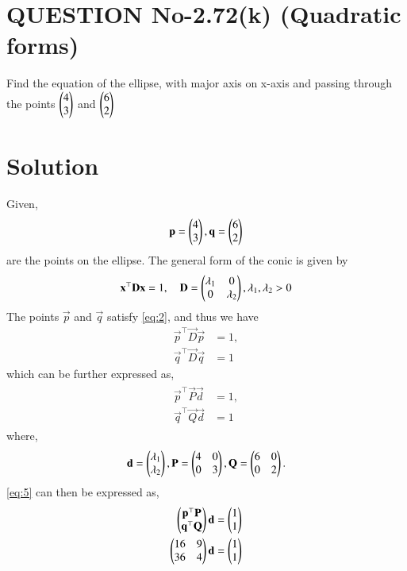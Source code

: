 \documentclass[journal,12pt,twocolumn]{IEEEtran}
\begin{document}
%
\section{QUESTION No-2.72(k) (Quadratic forms)}
\item Find the equation of the ellipse, with major axis on x-axis and passing through the points $\begin{pmatrix}4\\3\end{pmatrix}$  and $\begin{pmatrix} 6\\2\end{pmatrix}$ 
%
\section{Solution}
Given, 
\begin{align}
\mathbf{p} = \begin{pmatrix}4\\3\end{pmatrix} , \mathbf{q} = \begin{pmatrix} 6\\2\end{pmatrix}
\end{align}
are the points on the ellipse.
The general form of the conic is given by
\begin{align}
\label{eq:2}
\mathbf{x}^{\top}\mathbf{D}\mathbf{x} = 1, \quad \mathbf{D} = \begin{pmatrix}\lambda_1 & 0 \\ 0 & \lambda_2\end{pmatrix}, \lambda_1,\lambda_2 > 0
\end{align}
The points $\vec{p}$ and $\vec{q}$ satisfy \eqref{eq:2}, and thus we have
\begin{align}
\label{eq:ellipse_std_ab}
\vec{p}^{\top}\vec{D}\vec{p} &= 1,
\\
\vec{q}^{\top}\vec{D}\vec{q} &= 1
\end{align}
which can be further expressed as,
\begin{align}
\label{eq:5}
\begin{split}
\vec{p}^{\top}\vec{P}\vec{d} &= 1,
\\
\vec{q}^{\top}\vec{Q}\vec{d} &= 1
\end{split}
\end{align}
where,
\begin{align}
\mathbf{d} = \begin{pmatrix}\lambda_1\\ \lambda_2\end{pmatrix},
\mathbf{P} = \begin{pmatrix}4 & 0 \\ 0 & 3\end{pmatrix},
\mathbf{Q} = \begin{pmatrix}6 & 0 \\ 0 & 2\end{pmatrix}.
\end{align}
\eqref{eq:5} can then be expressed as,
\begin{align}
\begin{pmatrix}\mathbf{p}^{\top}\mathbf{P}\\ \mathbf{q}^{\top}\mathbf{Q}\end{pmatrix}\mathbf{d} &= \begin{pmatrix}1\\1\end{pmatrix}\\
\begin{pmatrix}16 & 9\\ 36 & 4\end{pmatrix}\mathbf{d} &= \begin{pmatrix}1\\1\end{pmatrix}\label{eq:8}
\end{align}
\end{document}
